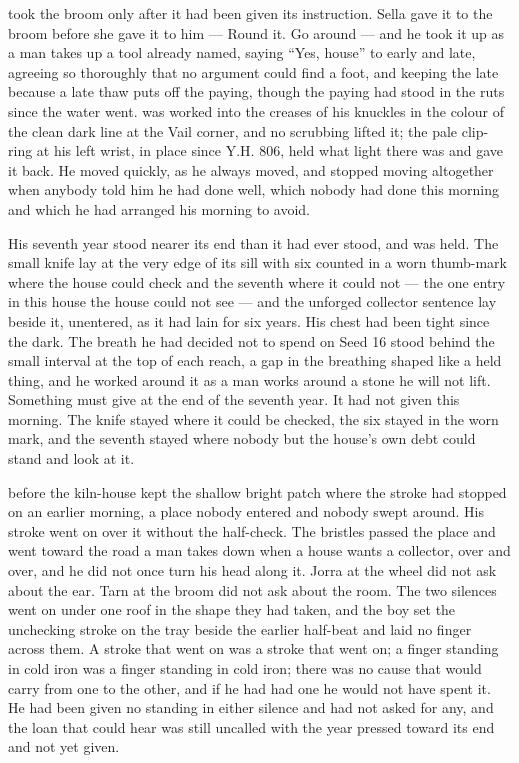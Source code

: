  took the broom only after it had been given its instruction. Sella gave it to the broom before she gave it to him --- Round it. Go around --- and he took it up as a man takes up a tool already named, saying “Yes, house” to  early and late, agreeing so thoroughly that no argument could find a foot, and keeping the late because a late thaw puts off the paying, though the paying had stood in the ruts since the water went.  was worked into the creases of his knuckles in the colour of the clean dark line at the Vail corner, and no scrubbing lifted it; the pale clip-ring at his left wrist, in place since Y.H. 806, held what light there was and gave it back. He moved quickly, as he always moved, and stopped moving altogether when anybody told him he had done well, which nobody had done this morning and which he had arranged his morning to avoid.

His seventh year stood nearer its end than it had ever stood, and was held. The small knife lay at the very edge of its sill with six counted in a worn thumb-mark where the house could check and the seventh where it could not --- the one entry in this house the house could not see --- and the unforged collector sentence lay beside it, unentered, as it had lain for six years. His chest had been tight since the dark. The breath he had decided not to spend on Seed 16 stood behind the small interval at the top of each reach, a gap in the breathing shaped like a held thing, and he worked around it as a man works around a stone he will not lift. Something must give at the end of the seventh year. It had not given this morning. The knife stayed where it could be checked, the six stayed in the worn mark, and the seventh stayed where nobody but the house's own debt could stand and look at it.

 before the kiln-house kept the shallow bright patch where the stroke had stopped on an earlier morning, a place nobody entered and nobody swept around. His stroke went on over it without the half-check. The bristles passed the place and went toward the road a man takes down when a house wants a collector, over and over, and he did not once turn his head along it. Jorra at the wheel did not ask about the ear. Tarn at the broom did not ask about the room. The two silences went on under one roof in the shape they had taken, and the boy set the unchecking stroke on the tray beside the earlier half-beat and laid no finger across them. A stroke that went on was a stroke that went on; a finger standing in cold iron was a finger standing in cold iron; there was no cause that would carry from one to the other, and if he had had one he would not have spent it. He had been given no standing in either silence and had not asked for any, and the loan that could hear was still uncalled with the year pressed toward its end and not yet given.


